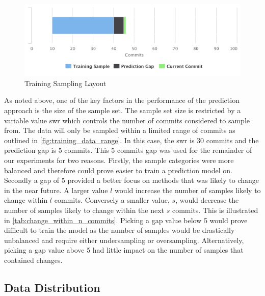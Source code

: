 \begin{figure}[!ht]
    \centering
        \includegraphics[width=1.0\textwidth]{images/training_sampling}
    \caption{Training Sampling Layout}
    \label{fig:training_data_range}
\end{figure}

As noted above, one of the key factors in the performance of the prediction approach is the size of the sample set. The sample set size is restricted by a variable value \gls{swr} which controls the number of commits considered to sample from. The data will only be sampled within a limited range of commits as outlined in \autoref{fig:training_data_range}. In this case, the \gls{swr} is 30 commits and the prediction gap is 5 commits. This 5 commits gap was used for the remainder of our experiments for two reasons. Firstly, the sample categories were more balanced and therefore could prove easier to train a prediction model on. Secondly a gap of 5 provided a better focus on methods that was likely to change in the near future. A larger value $l$ would increase the number of samples likely to change within $l$ commits. Conversely a smaller value, $s$, would decrease the number of samples likely to change within the next $s$ commits. This is illustrated in \autoref{tab:change_within_n_commits}. Picking a gap value below 5 would prove difficult to train the model as the number of samples would be drastically unbalanced and require either undersampling or oversampling. Alternatively, picking a gap value above 5 had little impact on the number of samples that contained changes.


\subsection{Data Distribution}
\label{subsec:data_distribution}

